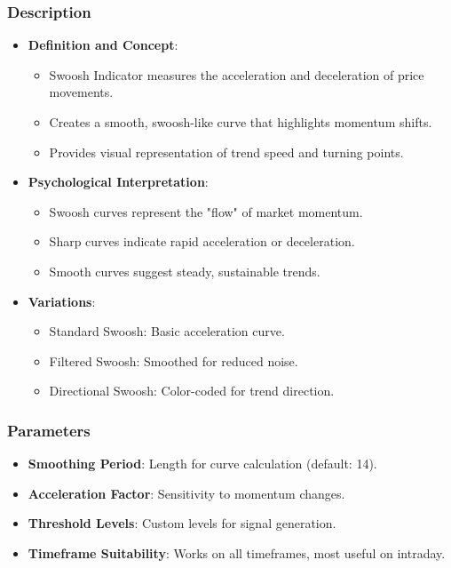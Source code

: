 \documentclass[12pt]{article}
\begin{document}
\subsubsection{Description}
\begin{itemize}
\item \textbf{Definition and Concept}:
  \begin{itemize}
  \item Swoosh Indicator measures the acceleration and deceleration of price movements.
  \item Creates a smooth, swoosh-like curve that highlights momentum shifts.
  \item Provides visual representation of trend speed and turning points.
  \end{itemize}
\item \textbf{Psychological Interpretation}:
  \begin{itemize}
  \item Swoosh curves represent the "flow" of market momentum.
  \item Sharp curves indicate rapid acceleration or deceleration.
  \item Smooth curves suggest steady, sustainable trends.
  \end{itemize}
\item \textbf{Variations}:
  \begin{itemize}
  \item Standard Swoosh: Basic acceleration curve.
  \item Filtered Swoosh: Smoothed for reduced noise.
  \item Directional Swoosh: Color-coded for trend direction.
  \end{itemize}
\end{itemize}

\subsubsection{Parameters}
\begin{itemize}
\item \textbf{Smoothing Period}: Length for curve calculation (default: 14).
\item \textbf{Acceleration Factor}: Sensitivity to momentum changes.
\item \textbf{Threshold Levels}: Custom levels for signal generation.
\item \textbf{Timeframe Suitability}: Works on all timeframes, most useful on intraday.
\end{itemize}
\end{document}
